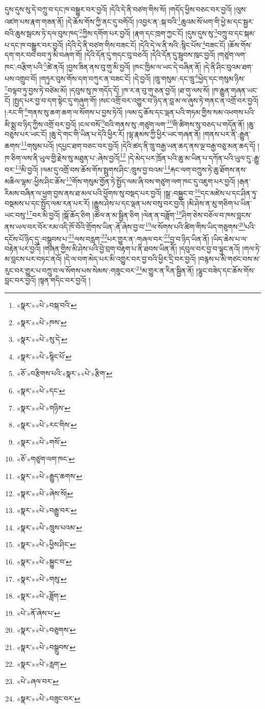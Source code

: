 དུས་དུས་སུ་དེ་བཀྲུ་བ་དང་ཁ་བསྒྱུར་བར་བྱའོ། །དེའི་དེ་ནི་བཙག་གིས་སོ། །གདོད་ཕྱིས་བཅང་བར་བྱའོ། །ལུས་འཛག་པས་རྣག་གཟན་ནོ། །དེ་ཆོས་གོས་ཀྱི་ནང་དུ་བགོའོ། །འབྱར་ན་:སྐ་བའི་\footnote{«སྣར་»«པེ་»བསྐ་བའི་}ཆུའམ་སོ་ཕག་གི་ཕྱེ་མ་དང་སྦྱར་བའི་ཆུས་སྦངས་ཏེ་དལ་བུས་ཁད་\footnote{«སྣར་»«པེ་»ཁས་}ཀྱིས་དགོག་པར་བྱའོ། །རྣག་དང་ཁྲག་ཀྱང་ངོ། །དུས་དུས་སུ་\footnote{«སྣར་»«པེ་»སུ་དེ་}བཀྲུ་བ་དང་སྐམ་པ་དང་ཁ་བསྒྱུར་བར་བྱའོ། །དེའི་དེ་ནི་བཙག་གིས་བཟང་ངོ། །དེའི་དེ་ལ་ནི་སའི་:སྙིང་པོས་\footnote{«སྣར་»«པེ་»སྙིང་པོ་}བཟང་ངོ། །ཆོས་གོས་དག་གར་བབ་བབ་ཏུ་མི་བཞག་གོ། །དེའི་དོན་དུ་གདང་བུ་བཅའོ། །དེའི་དོན་དུ་སྦུབས་ཁུང་བྱའོ། །གཙུག་ལག་ཁང་:བརྩིག་པའི་\footnote{«ཅོ་»བརྩིགས་པའི་«སྣར་»«པེ་»རྩིག་}ཚེ་ནའོ། །བྱས་ཟིན་ནས་བུ་གུ་མི་བྱའོ། །ཁང་ཁྱིམ་ལ་ཡང་དེ་བཞིན་ནོ། །དེ་ནི་ཤིང་བུའམ་ཐག་པས་འགྲུབ་བོ། །གཏུར་བུས་གོས་དག་བཀུར་ན་བཟང་ངོ། །དེ་བྱའོ། །ཁྲུ་གསུམ་:དང་ཁྲུ་\footnote{«སྣར་»«པེ་»དང་}ཕྱེད་དང་གསུམ་ཉིས་\footnote{«སྣར་»«པེ་»གཉིས་}བལྟབ་ཏུ་བྱས་ཏེ་བཙེམ་མོ། །དབུས་སུ་ཁ་གདོད་དོ། །ཁ་ར་ན་བུ་གུ་ཅན་བྱའོ། །ཐ་གུ་ལས་སོ། །ཁ་རྒྱུན་གཞན་ཡང་ངོ། །སྤྱད་པར་བྱ་བ་དག་སྟེང་དུ་གཞུག་གོ། །སང་འགྲོ་བར་འགྱུར་བ་ཉིད་ན་བླ་མ་ལ་ཞུས་ཏེ་གནང་ན་འགྲོ་བར་བྱའོ། །:རང་གི་\footnote{«སྣར་»«པེ་»རང་གིས་}གནས་སུ་ཆག་ཆག་ལ་སོགས་པ་བྱས་ཏེའོ། །ལམ་དུ་ཆོས་དང་ལྡན་པའི་གཏམ་གྱིས་སམ་འཕགས་པའི་མི་སྨྲ་བ་ཉིད་ཀྱིས་འགྲོ་བར་བྱའོ། །ངལ་བསོ་\footnote{«སྣར་»«པེ་»གསོ་}བའི་གནས་སུ་:གཙུག་ལག་\footnote{«ཅོ་»གཙུག་ལག་ཁང་}གི་ཚིགས་སུ་བཅད་པ་གདོན་ནོ། །ཆུ་བཅུས་པར་ཡང་ངོ། །ཆུ་དེ་གང་གི་ཡིན་པ་དེའི་ཕྱིར་རོ། །ལྷ་རྣམས་ཀྱི་ཕྱིར་ཡང་གཞན་ནོ། །གནས་པར་ནི་:རྒྱུན་ཆགས་\footnote{«སྣར་»«པེ་»རྒྱུད་ཆགས་}གསུམ་པའོ། །དཔྱང་ཐག་བཅང་བར་བྱའོ། །དེའི་ཚད་ནི་ཁྲུ་བརྒྱ་ཡན་ཆད་ནས་ལྔ་བརྒྱ་བཅུ་མན་ཆད་དོ། །ཁ་ཅིག་ལས་ནི་ཡུལ་གྱི་རྗེས་སུ་མཐུན་པ་:ཞེས་བྱའོ།\footnote{«སྣར་»«པེ་»ཞེས་སོ།} །དེ་མེད་པར་ཁྲོན་པའི་ཆུ་མ་ཡིན་པ་དཀོན་པའི་ཡུལ་དུ་:རྒྱུ་བར་\footnote{«སྣར་»«པེ་»བརྒྱུ་བར་}མི་བྱའོ། །ལམ་དུ་འགྲོ་བས་ཆོས་གོས་སྤྲུགས་ཤིང་:ཁྲུས་བྱ་བའམ་\footnote{«སྣར་»«པེ་»ཁྲུས་པའམ་}རྐང་ལག་བཀྲུས་ཏེ་ཆུ་ཐོགས་ནས་མཆིལ་ལྷམ་:ཕྱིས་ཤིང་ཆོས་\footnote{«སྣར་»«པེ་»ཕྱིས་ཤིང་}གོས་གསུམ་གྱོན་ཏེ་སྤྱོད་ལམ་ཞི་བས་གཙུག་ལག་ཁང་དུ་འཇུག་པར་བྱའོ། །རྒན་རིམས་བཞིན་ལ་ཕྱག་བྱས་ནས་ཐ་མལ་པའི་ཕྱོགས་སུ་བསྡད་པར་བྱའོ། །སྒྲ་:བསྐྱུང་བ་\footnote{«སྣར་»«པེ་»སྐྱུང་བ་}དང་མཛེས་པ་དང་ཤིན་ཏུ་བསྡམས་པ་དང་སྤྱོད་ལམ་རན་པར་རོ། །རྒྱུས་ཤེས་པ་དང་ལྡན་པས་བསུ་བར་བྱའོ། །མི་ཤེས་ན་མུ་གཅིག་པ་ཡིན་ཡང་བསུ་\footnote{«སྣར་»«པེ་»གསུ་}བར་མི་བྱའོ། །སྒོ་ཆོད་ཅིག །ཚོལ་ན་མ་སྦྱིན་ཅིག །ལེན་ན་བཟློག་\footnote{«སྣར་»«པེ་»ཟློག་}ཤིག་ཅེས་བཅོལ་བ་ཁས་བླངས་ནས་ཡལ་བར་བོར་རམ་འདི་ཁོ་བོའི་གྲོགས་ཡིན་:ནོ་ཞེས་བྱ་བ་\footnote{«པེ་»ནོ་ཞེས་པ་}ལ་སོགས་པའི་ཚིག་གིས་ཡིད་གཅུགས་\footnote{«སྣར་»«པེ་»བཅུགས་}པའི་དངོས་པོ་ཉིད་དུ་:བསྒྲུབས་པ་\footnote{«སྣར་»«པེ་»བསྒྲུབས་}ལས་བརླག་\footnote{«སྣར་»«པེ་»རླག་}པར་གྱུར་ན་:གཞལ་བར་\footnote{«པེ་»ཞལ་བར་}བྱ་བ་ཉིད་ཡིན་ནོ། །ཡིད་ཆེས་པ་ལ་བརྟེན་པར་བྱའོ། །གཞན་གྱིས་མི་ཤེས་པའི་བྱེ་བྲག་བརྟག་པ་ནི་ཐབས་ཡིན་ནོ། །དབུལ་བར་བྱ་བ་ལྟུང་ནའོ། །གལ་ཏེ་མ་བླངས་པར་བཏང་ནའོ། །དེ་ལ་བག་མེད་པར་མི་འགྱུར་བར་བྱ་བའི་ཕྱིར་དྲི་བར་བྱའོ། །བརྙས་པ་མི་གཙང་བས་མ་རུང་བར་གྱུར་པ་བཀྲུ་བ་ལ་སོགས་པས་སེམས་:གཟུང་བར་\footnote{«སྣར་»«པེ་»བཟུང་བར་}མ་གྱུར་ན་རིན་སྦྱིན་ནོ། །ལྷུང་བཟེད་དང་ཆོས་གོས་བླང་བར་བྱའོ། །སྟན་གདིང་བར་བྱའོ། །
